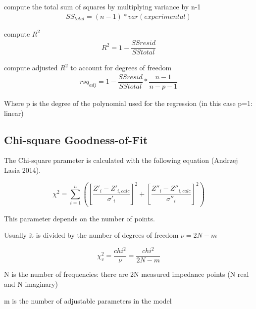 \documentclass[10pt,b5paper,oneside]{book}
\begin{document}
compute the total sum of squares by multiplying  variance by n-1
\begin{align}
	SS_{total} = (n-1) * var(experimental)
\end{align}

compute $R^2$
\begin{align}
	R^2 = 1 - \dfrac{SSresid}{SStotal}
\end{align}

compute adjusted $R^2$ to account for degrees of freedom
\begin{align}
	rsq_{adj} = 1 - \dfrac{SSresid}{SStotal} * \dfrac{n-1}{n-p-1}
\end{align}

Where p is the degree of the polynomial used for the regression (in this case p=1: linear)


\subsection{Chi-square Goodness-of-Fit}

The Chi-square parameter is calculated with the following equation (Andrzej Lasia 2014).

\[ \chi^2 = \sum_{i=1}^{n}{\left( \left[ \dfrac{Z'_i - Z'_{i,calc}}{\sigma'_i} \right]^2 + \left[ \dfrac{Z''_i - Z''_{i,calc}}{\sigma''_i} \right]^2 \right)} \]

This parameter depends on the number of points.

Usually it is divided by the number of degrees of freedom $\nu = 2N - m$

\[ \chi^2_v = \dfrac{chi^2}{\nu} = \dfrac{chi^2}{2N - m} \]

N is the number of frequencies: there are 2N measured impedance points (N real and N imaginary)

m is the number of adjustable parameters in the model


%
%
%
%
%
%
%
%
\end{document}
